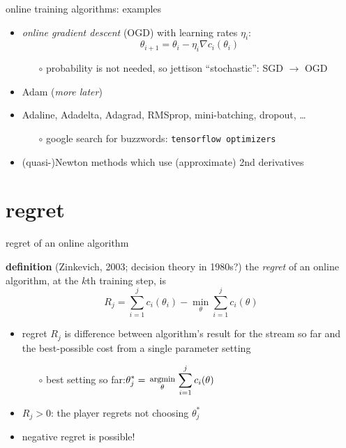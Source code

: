 \documentclass[xcolor={svgnames},
               hyperref={colorlinks,citecolor=DeepPink4,linkcolor=FireBrick,urlcolor=Maroon}]
               {beamer}
\newcommand{\grad}{\nabla}
\newcommand{\ds}{\displaystyle}
\begin{document}
\begin{frame}{online training algorithms: examples}

\begin{itemize}
\item \emph{online gradient descent} (OGD) with learning rates $\eta_i$:
   $$\theta_{i+1} = \theta_i - \eta_i \grad c_i(\theta_i)$$

    \begin{itemize}
    \item[$\circ$] probability is not needed, so jettison ``stochastic'': SGD $\to$ OGD
    \end{itemize}
\item Adam (\emph{more later})
\item Adaline, Adadelta, Adagrad, RMSprop, mini-batching, dropout, \dots
    \begin{itemize}
    \item[$\circ$] google search for buzzwords: \quad \texttt{tensorflow optimizers}
    \end{itemize}
\item (quasi-)Newton methods which use (approximate) 2nd derivatives
\end{itemize}
\end{frame}


\section{regret}

\begin{frame}{regret of an online algorithm}

\begin{block}{\textbf{definition} (Zinkevich, 2003; decision theory in 1980s?)}
the \emph{regret} of an online algorithm, at the $k$th training step, is
    $$R_j = \sum_{i=1}^j c_i(\theta_i) - \min_\theta \sum_{i=1}^j c_i(\theta)$$
\end{block}

\begin{itemize}
\item regret $R_j$ is difference between algorithm's result for the stream so far and the best-possible cost from a single parameter setting
    \begin{itemize}
    \item[$\circ$] best setting so far:\quad  $\ds \theta_j^* = \begin{smallmatrix} \phantom{x} \\ \text{\footnotesize argmin} \\ \theta \end{smallmatrix} \sum_{i=1}^j c_i(\theta)$
    \end{itemize}

\smallskip
\item $R_j>0$: the player regrets not choosing $\theta_j^*$
\item negative regret is possible!
\end{itemize}
\end{frame}
\end{document}
